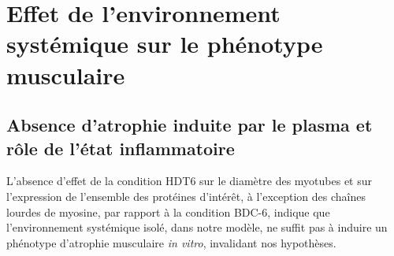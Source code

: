 \documentclass[11pt]{report}
\begin{document}
\section{Effet de l'environnement systémique sur le phénotype musculaire}

\subsection{Absence d'atrophie induite par le plasma et rôle de l'état inflammatoire}

L'absence d'effet de la condition HDT6 sur le diamètre des myotubes et sur l'expression de l'ensemble des protéines d'intérêt, à l'exception des chaînes lourdes de myosine, par rapport à la condition BDC-6, indique que l'environnement systémique isolé, dans notre modèle, ne suffit pas à induire un phénotype d'atrophie musculaire \textit{in vitro}, invalidant nos hypothèses.
\end{document}
